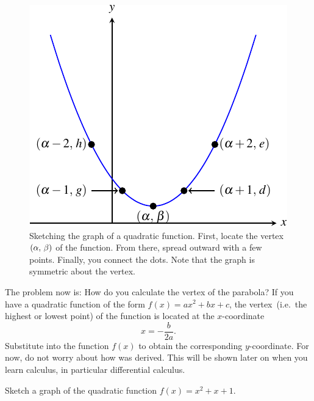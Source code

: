 \documentclass[a4paper,oneside,12pt]{article}
\begin{document}
\begin{figure}[!htbp]
\centering
\includegraphics[scale=1.2]{image/08/a1-bminus4-c10.pdf}
\caption{%
  Sketching the graph of a quadratic function.  First, locate the
  vertex $\left\lparen{\alpha},\, {\beta}\right\rparen$ of the function.  From there, spread
  outward with a few points.  Finally, you connect the dots.  Note
  that the graph is symmetric about the vertex.
}
\label{fig:sketch_parabola}
\end{figure}

The problem now is: How do you calculate the vertex of the parabola?
If you have a quadratic function of the form $f(x) = ax^2 + bx + c$,
the vertex~(i.e.~the highest or lowest point) of the function is
located at the $x$-coordinate
\begin{equation}
\label{eqn:parabola_tip_x_coordinate}
x
=
-\frac{b}{2a}.
\end{equation}
Substitute  into the
function $f(x)$ to obtain the corresponding $y$-coordinate.  For now,
do not worry about how  was
derived.  This will be shown later on when you learn calculus, in
particular differential calculus.

\begin{example}
\label{ex:quadratic_graph_a1_b1_c1}
Sketch a graph of the quadratic function $f(x) = x^2 + x + 1$.
\end{example}
\end{document}
